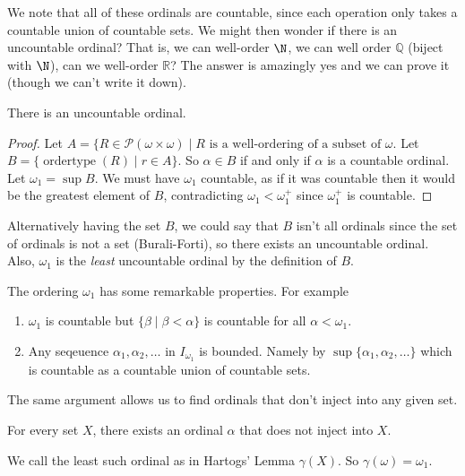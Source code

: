 \documentclass[a4paper]{scrartcl}
\begin{document}
We note that all of these ordinals are countable, since each operation only takes a countable union of countable sets. We might then wonder if there is an uncountable ordinal? That is, we can well-order $\N$, we can well order $\mathbb{Q}$ (biject with $\N$), can we well-order $\mathbb{R}$? The answer is amazingly yes and we can prove it (though we can't write it down).

\begin{theorem}
  There is an uncountable ordinal.
\end{theorem}
\begin{proof}
  Let $A = \{R \in \mathcal{P}(\omega \times \omega) \mid \text{$R$ is a well-ordering of a subset of $\omega$}$. Let $B = \{\operatorname{ordertype}(R) \mid r \in A\}$. So $\alpha \in B$ if and only if $\alpha$ is a countable ordinal. Let $\omega_1 = \sup B$. We must have $\omega_1$ countable, as if it was countable then it would be the greatest element of $B$, contradicting $\omega_1 < \omega_1^+$ since $\omega_1^+$ is countable.
\end{proof}

\begin{remark}
  Alternatively having the set $B$, we could say that $B$ isn't all ordinals since the set of ordinals is not a set (Burali-Forti), so there exists an uncountable ordinal. Also, $\omega_1$ is the \emph{least} uncountable ordinal by the definition of $B$.
\end{remark}

The ordering $\omega_1$ has some remarkable properties. For example
\begin{enumerate}
  \item $\omega_1$ is countable but $\{\beta \mid \beta < \alpha\}$ is countable for all $\alpha < \omega_1$.
  \item Any seqeuence $\alpha_1, \alpha_2, \dots$ in $I_{\omega_1}$ is bounded. Namely by $\sup\{\alpha_1, \alpha_2, \dots\}$ which is countable as a countable union of countable sets.
\end{enumerate}

The same argument allows us to find ordinals that don't inject into any given set.
\begin{theorem}
  For every set $X$, there exists an ordinal $\alpha$ that does not inject into $X$.
\end{theorem}

We call the least such ordinal as in Hartogs' Lemma $\gamma(X)$. So $\gamma(\omega) = \omega_1$.
\end{document}
